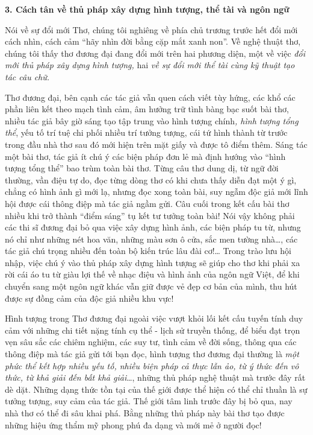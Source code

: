 \documentclass[../main.tex]{subfiles}
\begin{document}
\begin{multicols}{2}
 
\textbf{3. Cách tân về thủ pháp xây dựng hình tượng, thể tài và ngôn ngữ} 
 
Nói về sự đổi mới Thơ, chúng tôi nghiêng về phía chủ trương trước hết đổi mới cách nhìn, cách cảm “hãy nhìn đời bằng cặp mắt xanh non”. Về nghệ thuật thơ, chúng tôi thấy thơ đương đại đang đổi mới trên hai phương diện, một về việc \textit{đổi mới thủ pháp xây dựng hình tượng, }hai \textit{về sự  đổi mới thể tài cùng kỹ thuật tạo tác câu chữ.} 
  
Thơ đương đại, bên cạnh các tác giả vẫn quen cách viết tùy hứng, các khổ các phần liên kết theo mạch tình cảm, âm hưởng trữ tình bàng bạc suốt bài thơ, nhiều tác giả bây giờ sáng tạo tập trung vào hình tượng chính\textit{, hình tượng tổng thể}, yếu tố trí tuệ chi phối nhiều trí tưởng tượng, cái tứ hình thành từ trước trong đầu nhà thơ sau đó mới hiện trên mặt giấy và được tô điểm thêm. Sáng tác một bài thơ, tác giả ít chú ý các biện pháp đơn lẻ mà định hướng vào “hình tượng tổng thể” bao trùm toàn bài thơ. Từng câu thơ dung dị, từ ngữ đời thường, vần điệu tự do, đọc từng dòng thơ có khi chưa thấy diễn đạt một ý gì, chẳng có hình ảnh gì mới lạ, nhưng đọc xong toàn bài, suy ngẫm  độc giả mới lĩnh hội được cái thông điệp mà tác giả ngầm gửi. Câu cuối trong kết cấu bài thơ nhiều khi trở thành “điểm sáng” tụ kết tư tưởng toàn bài! Nói vậy không phải các thi sĩ đương đại bỏ qua việc xây dựng hình ảnh, các biện pháp tu từ, nhưng nó chỉ như những nét hoa văn, những màu sơn ô cửa, sắc men tường nhà…, các tác giả chú trọng nhiều đến toàn bộ kiến trúc lâu đài cơ!… Trong trào lưu hội nhập, việc chú ý vào thủ pháp xây dựng hình tượng sẽ giúp cho thơ khi phải xa rời cái áo tu từ giàu lợi thế về nhạc điệu và hình ảnh của ngôn ngữ Việt, để khi chuyển sang một ngôn ngữ khác vẫn giữ được vẻ đẹp cơ bản của mình, thu hút được sự đồng cảm của độc giả nhiều khu vực! 
 
Hình tượng trong Thơ đương đại ngoài việc vượt khỏi lối kết cấu tuyến tính duy cảm với những chi tiết nặng tính cụ thể - lịch sử truyền thống, để biểu đạt trọn vẹn sâu sắc các chiêm nghiệm, các suy tư, tình cảm về đời sống, thông qua các thông điệp mà tác giả gửi tới bạn đọc, hình tượng thơ đương đại thường là \textit{một phức thể kết hợp nhiều yếu tố, nhiều biện pháp cả thực lẫn ảo, từ  ý thức đến vô thức, từ khả giải đến bất khả giải}…, những thủ pháp nghệ thuật mà trước đây rất dè dặt. Những dạng thức tồn tại của thế giới được thể hiện có thể chỉ thuần là sự tưởng tượng, suy cảm của tác giả. Thế giới tâm linh trước đây bị bỏ qua, nay nhà thơ có thể đi sâu khai phá. Bằng những thủ pháp này bài thơ tạo được những hiệu ứng thẩm mỹ phong phú đa dạng và mới mẻ ở người đọc! 
 

\end{multicols}
\end{document}
